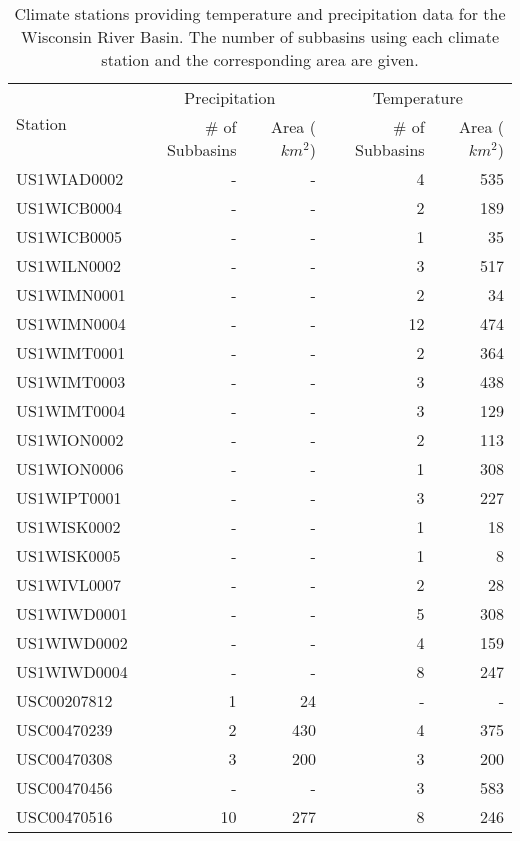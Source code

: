 \begin{table}[h!]
	\caption{Climate stations providing temperature and precipitation data for the Wisconsin River Basin. The number of subbasins using each climate station and the corresponding area are given.}
	\centering
		\begin{tabular}{l r r r r}
			\hline 
				\multirow{2}{*}{Station} & \multicolumn{2}{c}{Precipitation} & \multicolumn{2}{c}{Temperature} \\

				& \# of Subbasins 	 & 	Area ($km^2$)	 & 	\# of Subbasins & 	Area ($km^2$) \\
				\hline \hline
				US1WIAD0002	 & 	-	 & 	-	 & 	4	 & 	535 \\
				US1WICB0004	 & 	-	 & 	-	 & 	2	 & 	189 \\
				US1WICB0005	 & 	-	 & 	-	 & 	1	 & 	35 \\
				US1WILN0002	 & 	-	 & 	-	 & 	3	 & 	517 \\
				US1WIMN0001	 & 	-	 & 	-	 & 	2	 & 	34 \\
				US1WIMN0004	 & 	-	 & 	-	 & 	12	 & 	474 \\
				US1WIMT0001	 & 	-	 & 	-	 & 	2	 & 	364 \\
				US1WIMT0003	 & 	-	 & 	-	 & 	3	 & 	438 \\ 
				US1WIMT0004	 & 	-	 & 	-	 & 	3	 & 	129 \\
				US1WION0002	 & 	-	 & 	-	 & 	2	 & 	113 \\
				US1WION0006	 & 	-	 & 	-	 & 	1	 & 	308 \\
				US1WIPT0001	 & 	-	 & 	-	 & 	3	 & 	227 \\
				US1WISK0002	 & 	-	 & 	-	 & 	1	 & 	18 \\
				US1WISK0005	 & 	-	 & 	-	 & 	1	 & 	8 \\
				US1WIVL0007	 & 	-	 & 	-	 & 	2	 & 	28 \\
				US1WIWD0001	 & 	-	 & 	-	 & 	5	 & 	308 \\
				US1WIWD0002	 & 	-	 & 	-	 & 	4	 & 	159 \\
				US1WIWD0004	 & 	-	 & 	-	 & 	8	 & 	247 \\
				USC00207812	 & 	1	 & 	24	 & 	-	 & 	- \\
				USC00470239	 & 	2	 & 	430	 & 	4	 & 	375 \\
				USC00470308	 & 	3	 & 	200	 & 	3	 & 	200 \\
				USC00470456	 & 	-	 & 	-	 & 	3	 & 	583 \\
				USC00470516	 & 	10	 & 	277	 & 	8	 & 	246 \\

\end{tabular}
\end{table}
